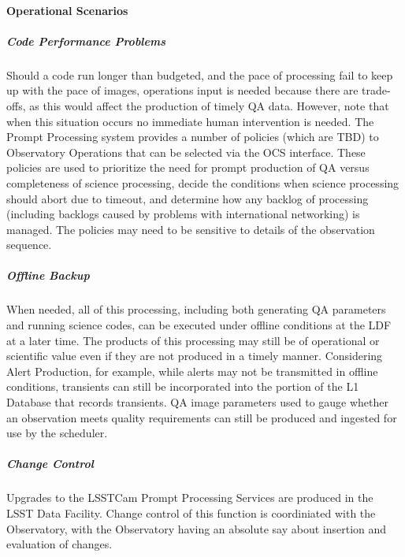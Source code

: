 \paragraph{Operational Scenarios}

\subparagraph{Code Performance Problems} 
Should a code run longer than budgeted, and the pace of processing
fail to keep up with the pace of images, operations input is needed
because there are trade-offs, as this would affect the production of
timely QA data.  However, note that when this situation occurs no
immediate human intervention is needed.  The Prompt Processing system
provides a number of policies (which are TBD) to Observatory
Operations that can be selected via the OCS interface.  These policies
are used to prioritize the need for prompt production of QA versus
completeness of science processing, decide the conditions when science
processing should abort due to timeout, and determine how any backlog
of processing (including backlogs caused by problems with
international networking) is managed.  The policies may need to be
sensitive to details of the observation sequence.

\subparagraph{Offline Backup} 
When needed, all of this processing, including both generating QA
parameters and running science codes, can be executed under offline
conditions at the LDF at a later time.  The products of
this processing may still be of operational or scientific value even
if they are not produced in a timely manner.  Considering Alert
Production, for example, while alerts may not be transmitted in
offline conditions, transients can still be incorporated into the
portion of the L1 Database that records transients.  QA image
parameters used to gauge whether an observation meets quality
requirements can still be produced and ingested for use by the scheduler.

\subparagraph{Change Control}
Upgrades to the LSSTCam Prompt Processing Services are produced in the LSST Data Facility. Change control 
of this function is coordiniated with the Observatory, with the Observatory having an absolute say
about insertion and evaluation of changes.
